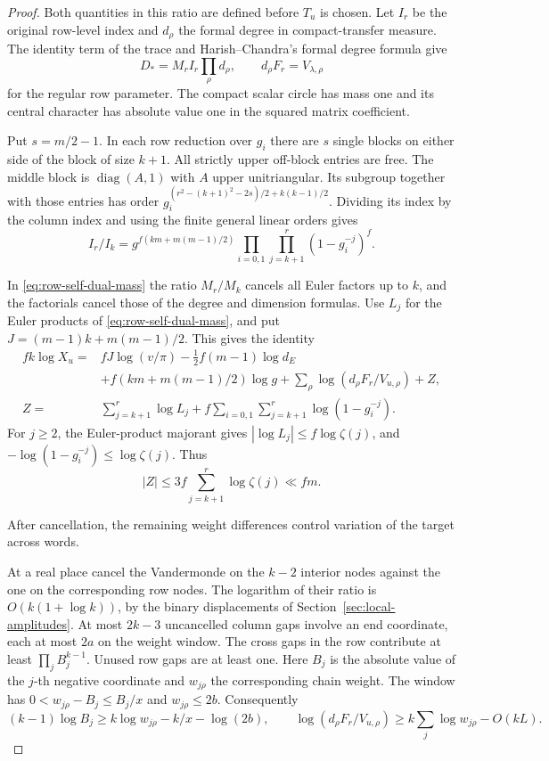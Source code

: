 \begin{proof}

Both quantities in this ratio
are defined before \(T_u\) is chosen. Let \(I_r\) be the original row-level index and \(d_\rho\) the
formal degree in compact-transfer measure. The identity term of the
trace and Harish--Chandra's formal degree formula give
\[
 D_*=M_r I_r\prod_\rho d_\rho,\qquad
 d_\rho F_r=V_{\lambda,\rho}
\]
for the regular row parameter.
The compact scalar circle has mass one and its central character
has absolute value one in the squared matrix coefficient.
\cite{atiyah-schmid}

Put \(s=m/2-1\). In each row reduction over \(g_i\) there are \(s\)
single blocks on either side of the block of size \(k+1\).
All strictly upper off-block entries are free. The middle block
is \(\operatorname{diag}(A,1)\) with \(A\) upper unitriangular.
Its subgroup together with those entries has order
\(g_i^{(r^2-(k+1)^2-2s)/2+k(k-1)/2}\). Dividing its index by the
column index and using the finite general linear orders gives
\[
 I_r/I_k=g^{f(km+m(m-1)/2)}
       \prod_{i=0,1}\prod_{j=k+1}^r(1-g_i^{-j})^f .
\]

In \eqref{eq:row-self-dual-mass} the ratio \(M_r/M_k\) cancels
all Euler factors up to \(k\), and the factorials cancel those of
the degree and dimension formulas. Use \(L_j\) for the Euler
products of \eqref{eq:row-self-dual-mass}, and put
\(J=(m-1)k+m(m-1)/2\). This gives the identity
\begin{align*}
 fk\log X_u={}& fJ\log(v/\pi)-\tfrac12 f(m-1)\log d_E\\
 &+f(km+m(m-1)/2)\log g
       +\sum_\rho\log(d_\rho F_r/V_{u,\rho})+Z,\\
 Z={}&\sum_{j=k+1}^r\log L_j+
       f\sum_{i=0,1}\sum_{j=k+1}^r\log(1-g_i^{-j}).
\end{align*}
For \(j\ge2\), the Euler-product majorant gives
\(|\log L_j|\le f\log\zeta(j)\), and
\(-\log(1-g_i^{-j})\le\log\zeta(j)\). Thus
\[
 |Z|\le 3f\sum_{j=k+1}^r\log\zeta(j)\ll fm .
\]


After cancellation, the remaining weight differences control variation of the target across words.


At a real place cancel the Vandermonde on the \(k-2\) interior
nodes against the one on the corresponding row nodes. The
logarithm of their ratio is \(O(k(1+\log k))\), by the binary
displacements of Section~\ref{sec:local-amplitudes}. At most \(2k-3\)
uncancelled column gaps involve an end coordinate, each at most
\(2a\) on the weight window. The cross gaps in the row contribute
at least \(\prod_j B_j^{k-1}\). Unused row gaps are at least one.
Here \(B_j\) is the absolute value of the \(j\)-th negative
coordinate and \(w_{j\rho}\) the corresponding chain weight.
The window has \(0<w_{j\rho}-B_j\le B_j/x\) and \(w_{j\rho}\le2b\).
Consequently
\[
 (k-1)\log B_j\ge k\log w_{j\rho}-k/x-\log(2b),\qquad
 \log(d_\rho F_r/V_{u,\rho})\ge k\sum_j\log w_{j\rho}-O(kL).
\]


\end{proof}
